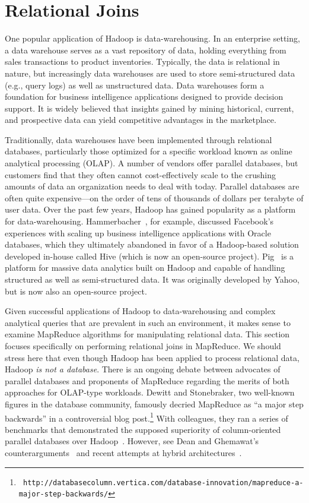 \section{Relational Joins}
\label{chapter3:joins}

One popular application of Hadoop is data-warehousing.  In an
enterprise setting, a data warehouse serves as a vast repository of
data, holding everything from sales transactions to product
inventories.  Typically, the data is relational in nature, but
increasingly data warehouses are used to store semi-structured data
(e.g., query logs) as well as unstructured data.  Data warehouses form
a foundation for business intelligence applications designed to
provide decision support.  It is widely believed that insights gained
by mining historical, current, and prospective data can yield
competitive advantages in the marketplace.

Traditionally, data warehouses have been implemented through
relational databases, particularly those optimized for a specific
workload known as online analytical processing (OLAP).  A number of
vendors offer parallel databases, but customers find that they often
cannot cost-effectively scale to the crushing amounts of data an
organization needs to deal with today.  Parallel databases are often
quite expensive---on the order of tens of thousands of dollars per
terabyte of user data.  Over the past few years, Hadoop has gained
popularity as a platform for data-warehousing.
Hammerbacher~\cite{Hammerbacher_2009}, for example, discussed
Facebook's experiences with scaling up business intelligence
applications with Oracle databases, which they ultimately abandoned in
favor of a Hadoop-based solution developed in-house called Hive (which
is now an open-source project).  Pig~\cite{Olston_etal_SIGMOD2008} is
a platform for massive data analytics built on Hadoop and capable of
handling structured as well as semi-structured data.  It was
originally developed by Yahoo, but is now also an open-source project.

Given successful applications of Hadoop to data-warehousing and
complex analytical queries that are prevalent in such an environment,
it makes sense to examine MapReduce algorithms for manipulating
relational data.  This section focuses specifically on performing
relational joins in MapReduce.  We should stress here that even though
Hadoop has been applied to process relational data, Hadoop \emph{is not
  a database}.  There is an ongoing debate between advocates of
parallel databases and proponents of MapReduce regarding the merits of
both approaches for OLAP-type workloads.  Dewitt and Stonebraker, two
well-known figures in the database community, famously decried
MapReduce as ``a major step backwards'' in a controversial blog
post.\footnote{\texttt{
  http://databasecolumn.vertica.com/database-innovation/mapreduce-a-major-step-backwards/}}
With colleagues, they ran a series of benchmarks that demonstrated the
supposed superiority of column-oriented parallel databases over
Hadoop~\cite{Pavlo_etal_SIGMOD2009,Stonebraker_etal_CACM2010}. However,
see Dean and Ghemawat's counterarguments~\cite{Dean_Ghemawat_CACM2010}
and recent attempts at hybrid
architectures~\cite{Abouzeid_etal_VLDB2009}.

